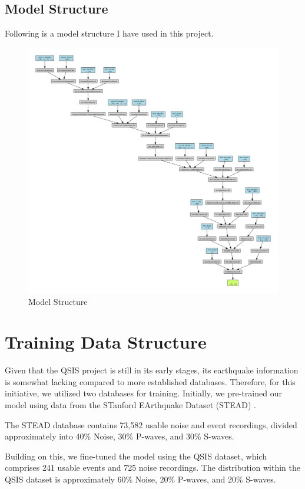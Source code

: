 \documentclass[a4paper,12pt, oneside]{article}
\begin{document}
\subsection{Model Structure}
Following is a model structure I have used in this project.
\begin{figure}[H]
\centering
\includegraphics[width = 6in]{EarthquakeCNN_Model.pdf}
\caption{Model Structure}\label{EarthquakeCNN_Model_Structure}
\end{figure}
\newpage
\section{Training Data Structure}

Given that the QSIS project is still in its early stages, its earthquake information is somewhat lacking compared to more established databases. Therefore, for this initiative, we utilized two databases for training. Initially, we pre-trained our model using data from the STanford EArthquake Dataset (STEAD) \cite{8871127}.

The STEAD database contains 73,582 usable noise and event recordings, divided approximately into 40\% Noise, 30\% P-waves, and 30\% S-waves.

Building on this, we fine-tuned the model using the QSIS dataset, which comprises 241 usable events and 725 noise recordings. The distribution within the QSIS dataset is approximately 60\% Noise, 20\% P-waves, and 20\% S-waves.
\end{document}
